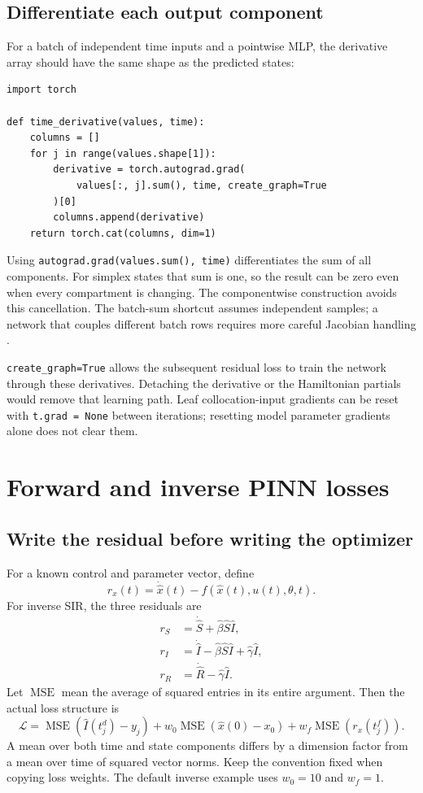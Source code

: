 \documentclass[11pt,a4paper]{article}
\theoremstyle{definition}
\theoremstyle{remark}
\begin{document}
\subsection{Differentiate each output component}
For a batch of independent time inputs and a pointwise MLP, the derivative array should have the same shape as the predicted states:
\begin{lstlisting}[caption={Componentwise physical-time derivatives}]
import torch

def time_derivative(values, time):
    columns = []
    for j in range(values.shape[1]):
        derivative = torch.autograd.grad(
            values[:, j].sum(), time, create_graph=True
        )[0]
        columns.append(derivative)
    return torch.cat(columns, dim=1)
\end{lstlisting}
Using \texttt{autograd.grad(values.sum(), time)} differentiates the sum of all components. For simplex states that sum is one, so the result can be zero even when every compartment is changing. The componentwise construction avoids this cancellation. The batch-sum shortcut assumes independent samples; a network that couples different batch rows requires more careful Jacobian handling \cite{torchgrad}.

\texttt{create\_graph=True} allows the subsequent residual loss to train the network through these derivatives. Detaching the derivative or the Hamiltonian partials would remove that learning path. Leaf collocation-input gradients can be reset with \texttt{t.grad = None} between iterations; resetting model parameter gradients alone does not clear them.

\section{Forward and inverse PINN losses}
\subsection{Write the residual before writing the optimizer}
For a known control and parameter vector, define
\begin{equation}
r_x(t)=\dot{\hat x}(t)-f(\hat x(t),u(t),\theta,t).
\end{equation}
For inverse SIR, the three residuals are
\begin{align}
r_S&=\dot{\hat S}+\hat\beta\hat S\hat I,\nonumber\\
r_I&=\dot{\hat I}-\hat\beta\hat S\hat I+\hat\gamma\hat I,\label{eq:sir-residual}\\
r_R&=\dot{\hat R}-\hat\gamma\hat I.\nonumber
\end{align}
Let $\operatorname{MSE}$ mean the average of squared entries in its entire argument. Then the actual loss structure is
\begin{equation}
\mathcal L=\operatorname{MSE}(\hat I(t_j^d)-y_j)
+w_0\operatorname{MSE}(\hat x(0)-x_0)
+w_f\operatorname{MSE}(r_x(t_j^f)).
\label{eq:inverse-loss}
\end{equation}
A mean over both time and state components differs by a dimension factor from a mean over time of squared vector norms. Keep the convention fixed when copying loss weights. The default inverse example uses $w_0=10$ and $w_f=1$.
\end{document}
